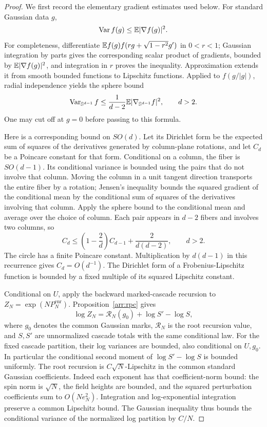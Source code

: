 \begin{proof}
We first record the elementary gradient estimates used below.
For standard Gaussian data \(g\),
\[
 \operatorname{Var} f(g)\le \mathbb E|\nabla f(g)|^2.
\]
For completeness, differentiate
\(\mathbb E f(g)f(rg+\sqrt{1-r^2}g')\) in \(0<r<1\);
Gaussian integration by parts gives the corresponding scalar product
of gradients, bounded by \(\mathbb E|\nabla f(g)|^2\), and integration in \(r\)
proves the inequality.  Approximation extends it from smooth bounded
functions to Lipschitz functions.
Applied to \(f(g/|g|)\), radial independence yields the sphere bound
\[
 \operatorname{Var}_{\mathbb S^{d-1}}f
 \le \frac1{d-2}\mathbb E|\nabla_{\mathbb S^{d-1}}f|^2,\qquad d>2.
\]
One may cut off at \(g=0\) before passing to this formula.

Here is a corresponding bound on \(SO(d)\).  Let its Dirichlet form be
the expected sum of squares of the derivatives generated by
column-plane rotations, and let \(C_d\) be a Poincare constant for that
form.  Conditional on a column, the fiber is \(SO(d-1)\).  Its
conditional variance is bounded using the pairs that do not involve
that column.  Moving the column in a unit tangent direction transports
the entire fiber by a rotation; Jensen's inequality bounds the squared
gradient of the conditional mean by the conditional sum of squares of
the derivatives involving that column.  Apply the sphere bound to the
conditional mean and average over the choice of column.  Each pair
appears in \(d-2\) fibers and involves two columns, so
\[
 C_d\le\left(1-\frac2d\right)C_{d-1}
            +\frac2{d(d-2)},\qquad d>2.
\]
The circle has a finite Poincare constant.  Multiplication by
\(d(d-1)\) in this recurrence gives \(C_d=O(d^{-1})\).
The Dirichlet form of a Frobenius-Lipschitz function is bounded by a
fixed multiple of its squared Lipschitz constant.

Conditional on \(U\), apply the backward marked-cascade recursion to
\(Z_N=\exp(NP_N^{\mathrm{enr}})\).  Proposition~\ref{arr:rpc}
gives
\[
 \log Z_N=\mathcal R_N(g_0)+\log S'-\log S,
\]
where \(g_0\) denotes the common Gaussian marks,
\(\mathcal R_N\) is the root recursion value, and \(S,S'\)
are unnormalized cascade totals with the same conditional law.
For the fixed cascade partition, their log variances are bounded,
also conditional on \(U,g_0\).  In particular the conditional
second moment of \(\log S'-\log S\) is bounded uniformly.
The root recursion is
\(C\sqrt N\)-Lipschitz in the common standard Gaussian coefficients.
Indeed each exponent has that coefficient-norm bound: the spin norm
is \(\sqrt N\), the field heights are bounded, and the squared
perturbation coefficients sum to \(O(Ne_N^2)\).  Integration and
log-exponential integration preserve a common Lipschitz bound.
The Gaussian inequality thus bounds the conditional variance of
the normalized log partition by \(C/N\).


\end{proof}
